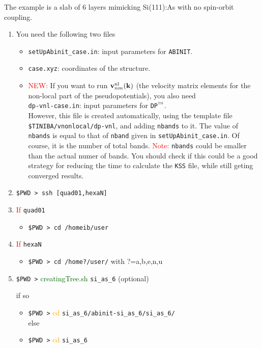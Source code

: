\documentclass[12pt]{article}
\numberwithin{equation}{section}
\begin{document}
The example is a slab of 6 layers mimicking Si(111):As with no spin-orbit
coupling. 
\begin{enumerate}
\item You need the following two files
\begin{itemize}
\item \verb=setUpAbinit_case.in=: input parameters for \verb=ABINIT=\copyr.
\item \verb=case.xyz=: coordinates of the structure. 
\item \textcolor{red}{NEW:}\label{DP}
If you want to run $\mathbf{v}^{\mathrm{nl}}_{nm}(\mathbf{k})$ (the velocity matrix
  elements for the non-local part of the pseudopotentials), you also
  need\\
\verb=dp-vnl-case.in=: input parameters for \verb=DP=$\tm$.\\
However, this file is created automatically, using the template file
\verb=$TINIBA/vnonlocal/dp-vnl=, and adding \verb=nbands= to it.
The value of \verb=nbands= is equal to that of \verb=nband= given in  
\verb=setUpAbinit_case.in=. Of course, it is the number of total
bands.
\textcolor{red}{Note:} \verb=nbands= could be smaller than the actual
numer of bands. You should check if this could be a good strategy for
reducing the time to calculate the \verb=KSS= file, 
while still geting converged results. 
\end{itemize}
\item \verb=$PWD > ssh [quad01,hexaN]= 

\item\textcolor{red}{If} \verb=quad01= 
\begin{itemize}
\item \verb=$PWD > cd /homeib/user= 
\end{itemize}
\item\textcolor{red}{If} \verb=hexaN=
\begin{itemize}
\item \verb=$PWD > cd /home?/user/=  with ?=a,b,e,n,u 
\end{itemize}
\item 
\verb=$PWD >= \textcolor{darkgreen}{creatingTree.sh} \verb=si_as_6=
(optional)\\ \strut\hspace{.9cm}if so 
\begin{itemize}
\item \verb=$PWD >= \textcolor{orange}{cd} \verb=si_as_6/abinit-si_as_6/si_as_6/=\\else
\item \verb=$PWD >= \textcolor{orange}{cd} \verb=si_as_6=
\end{itemize}


\end{enumerate}
\end{document}
